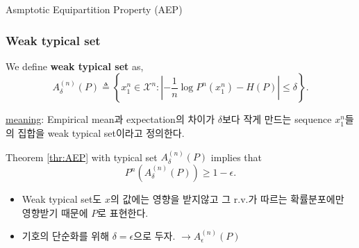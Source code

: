 \documentclass[9pt]{beamer}
\begin{document}
\begin{section}{Asmptotic Equipartition Property (AEP)}
        \begin{frame}
            \frametitle{Weak typical set}
            \begin{definition}
                We define \textbf{weak typical set} as,
                $$ A_\delta^{(n)}(P) \triangleq\left\{x_1^n \in \mathcal X^n:\left|-\frac{1}{n} \log P^n\left(x_1^n\right)-H(P)\right| \leq \delta\right\}. $$
            \end{definition}
            \checkmark \underline{meaning}: Empirical mean과 expectation의 차이가 $\delta$보다 작게 만드는 sequence $x_1^n$들의 집합을 weak typical set이라고 정의한다.
            \begin{corollary}
                Theorem \ref{thr:AEP} with typical set $A_{\delta}^{(n)}(P)$ implies that $$ P^n\left(A_\delta^{(n)}(P)\right) \geq 1-\epsilon. $$
            \end{corollary}
            \begin{itemize}
                \item Weak typical set도 $x$의 값에는 영향을 받지않고 그 r.v.가 따르는 확률분포에만 영향받기 때문에 $P$로 표현한다.
                \item 기호의 단순화를 위해 $\delta = \epsilon$으로 두자. $\rightarrow A_{\epsilon}^{(n)}(P)$
            \end{itemize}
            
        \end{frame}   


\end{section}
\end{document}

